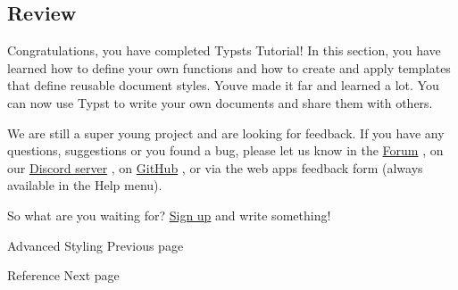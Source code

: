 \subsection{Review}\label{review}

Congratulations, you have completed Typst\textquotesingle s Tutorial! In
this section, you have learned how to define your own functions and how
to create and apply templates that define reusable document styles.
You\textquotesingle ve made it far and learned a lot. You can now use
Typst to write your own documents and share them with others.

We are still a super young project and are looking for feedback. If you
have any questions, suggestions or you found a bug, please let us know
in the \href{https://forum.typst.app/}{Forum} , on our
\href{https://discord.gg/2uDybryKPe}{Discord server} , on
\href{https://github.com/typst/typst/}{GitHub} , or via the web
app\textquotesingle s feedback form (always available in the Help menu).

So what are you waiting for? \href{https://typst.app}{Sign up} and write
something!

\href{/docs/tutorial/advanced-styling/}{\pandocbounded{}}

{ Advanced Styling } { Previous page }

\href{/docs/reference/}{\pandocbounded{}}

{ Reference } { Next page }


